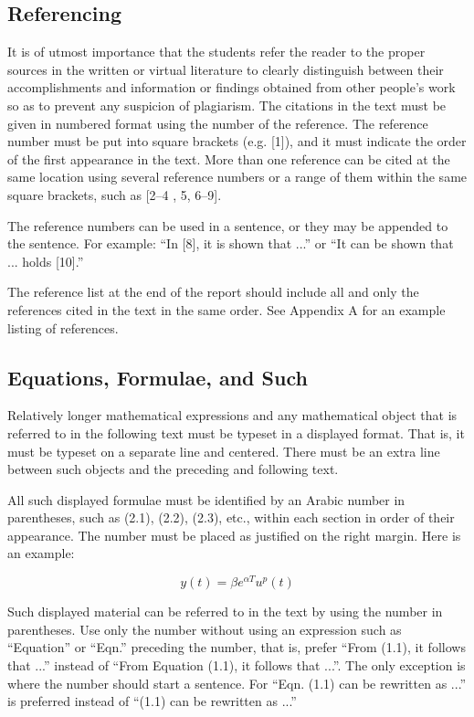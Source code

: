 \documentclass[12pt]{article} %
\numberwithin{equation}{section}
\numberwithin{figure}{section}
\numberwithin{table}{section}
\numberwithin{algorithm}{section}
\begin{document}
\subsection{Referencing}

It is of utmost importance that the students refer the reader to the proper sources in the written or virtual literature to clearly distinguish between their accomplishments and information or findings obtained from other people’s work so as to prevent any suspicion of plagiarism. The citations in the text must be given in numbered format using the number of the reference. The reference number must be put into square brackets (e.g. [1]), and it must indicate the order of the first appearance in the text. More than one reference can be cited at the same location using several reference numbers or a range of them within the same square brackets, such as [2–4 , 5, 6–9].

The reference numbers can be used in a sentence, or they may be appended to the sentence. For example: “In [8], it is shown that ...” or “It can be shown that ... holds [10].”

The reference list at the end of the report should include all and only the references cited in the text in the same order. See Appendix A for an example listing of references.

\subsection{Equations, Formulae, and Such}

Relatively longer mathematical expressions and any mathematical object that is referred to in the following text must be typeset in a displayed format. That is, it must be typeset on a separate line and centered. There must be an extra line between such objects and the preceding and following text.

All such displayed formulae must be identified by an Arabic number in parentheses, such as (2.1), (2.2), (2.3), etc., within each section in order of their appearance. The number must be placed as justified on the right margin. Here is an example:

\begin{equation}
    y(t)= \beta e^{\alpha T} u^p (t)
\end{equation}

\vspace{12pt}

Such displayed material can be referred to in the text by using the number in parentheses. Use only the number without using an expression such as “Equation” or “Eqn.” preceding the number, that is, prefer “From (1.1), it follows that ...” instead of “From Equation (1.1), it follows that ...”. The only exception is where the number should start a sentence. For “Eqn. (1.1) can be rewritten as ...” is preferred instead of “(1.1) can be rewritten as ...”
\end{document}
